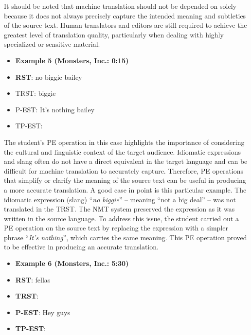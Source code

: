 \documentclass[english]{textolivre}
\begin{document}
It should be noted that machine translation should not be depended on solely because it does not always precisely capture the intended meaning and subtleties of the source text. Human translators and editors are still required to achieve the greatest level of translation quality, particularly when dealing with highly specialized or sensitive material.

\begin{itemize}
\item \textbf{Example 5 (Monsters, Inc.: 0:15)}
\item \textbf{RST}: no biggie bailey
\item TRST:  biggie
\item P-EST: It's nothing bailey
\item TP-EST: 
\end{itemize}

The student’s PE operation in this case highlights the importance of considering the cultural and linguistic context of the target audience. Idiomatic expressions and slang often do not have a direct equivalent in the target language and can be difficult for machine translation to accurately capture. Therefore, PE operations that simplify or clarify the meaning of the source text can be useful in producing a more accurate translation. A good case in point is this particular example. The idiomatic expression (slang) “\emph{no biggie}” – meaning “not a big deal” – was not translated in the TRST. The NMT system preserved the expression as it was written in the source language. To address this issue, the student carried out a PE operation on the source text by replacing the expression with a simpler phrase “\emph{It’s nothing}”, which carries the same meaning. This PE operation proved to be effective in producing an accurate translation.

\begin{itemize}
\item \textbf{Example 6 (Monsters, Inc.: 5:30)}
\item \textbf{RST}: fellas
\item \textbf{TRST}: 
\item \textbf{P-EST}: Hey guys
\item \textbf{TP-EST}: 
\end{itemize}
\end{document}

